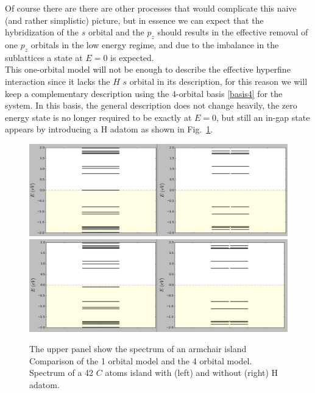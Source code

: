 Of course there are there are other processes that would complicate this naive (and rather simplistic) picture, but in essence we can expect that the hybridization of the $s$ orbital and the $p_z$ should results in the effective removal of one $p_z$ orbitals in the low energy regime, and due to the imbalance in the sublattices a state at $E=0$ is expected.\\

This one-orbital model will not be enough to describe the effective hyperfine interaction since it lacks the $H$ $s$ orbital in its description, for this reason we will keep a complementary description using the 4-orbital basis \eqref{basis4} for the system. In this basis, the general description does not change heavily, the zero energy state is no longer required to be exactly at $E=0$, but still an in-gap state appears by introducing a H adatom as shown in Fig.~\ref{spectrum_1orb_4orb}.
\begin{figure}[h!]
\centering
\includegraphics{chapter05/figures/spectrum1orb.png}
\includegraphics{chapter05/figures/spectrum4orb.png}
\vspace{-5pt}
\caption{The upper panel show the spectrum of an armchair island Comparison of the 1 orbital model and the 4 orbital model. Spectrum of a 42 $C$ atoms island with (left) and without (right) H adatom.}
\label{spectrum_1orb_4orb}
\end{figure}
\FloatBarrier



